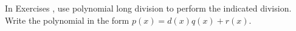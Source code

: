 {\noindent In Exercises}
{, use polynomial long division to perform the indicated division.  Write the polynomial in the form $p(x) = d(x)q(x) + r(x)$.}
